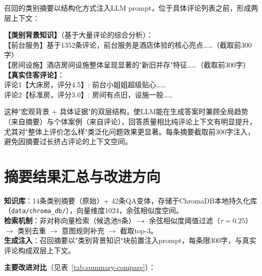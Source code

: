 \documentclass[11pt, a4paper]{article}
\begin{document}
召回的类别摘要以结构化方式注入LLM prompt，位于具体评论列表之前，形成两层上下文：

\begin{notebox}[Prompt结构]
\textbf{【类别背景知识】}（基于大量评论的综合分析）：\\
【前台服务】基于1352条评论，前台服务是酒店体验的核心亮点……（截取前300字）\\
【房间设施】酒店房间设施整体呈现显著的"新旧并存"特征……（截取前300字）\\[0.5em]
\textbf{【真实住客评论】}：\\
评论1【大床房，评分4.5】: 前台小姐姐超级贴心……\\
评论2【标准房，评分3.0】: 房间有点旧，设施一般……
\end{notebox}

这种"宏观背景 + 具体证据"的双层结构，使LLM能在生成答案时兼顾全局趋势（来自摘要）与个体案例（来自评论），回答质量相比纯评论上下文有明显提升，尤其对"整体上评价怎么样"类泛化问题效果更显著。每条摘要截取前300字注入，避免因摘要过长挤占评论的上下文空间。

\section{摘要结果汇总与改进方向}

\begin{notebox}[摘要检索当前实现总览]
\textbf{知识库}：14条类别摘要（原始）+ 42条QA变体，存储于ChromaDB本地持久化库（\texttt{data/chroma\_db/}），向量维度1024，余弦相似度空间。\\[0.4em]
\textbf{检索机制}：非对称向量检索（候选池8条）$\rightarrow$ 余弦相似度阈值过滤（$\tau=0.25$）$\rightarrow$ 类别去重 $\rightarrow$ 意图规则补充 $\rightarrow$ 截取top-3。\\[0.4em]
\textbf{生成注入}：召回摘要以"类别背景知识"块前置注入prompt，每条限300字，与真实评论构成双层上下文。
\end{notebox}

\vspace{0.6em}

\textbf{主要改进对比}（见表~\ref{tab:summary-compare}）：
\end{document}
